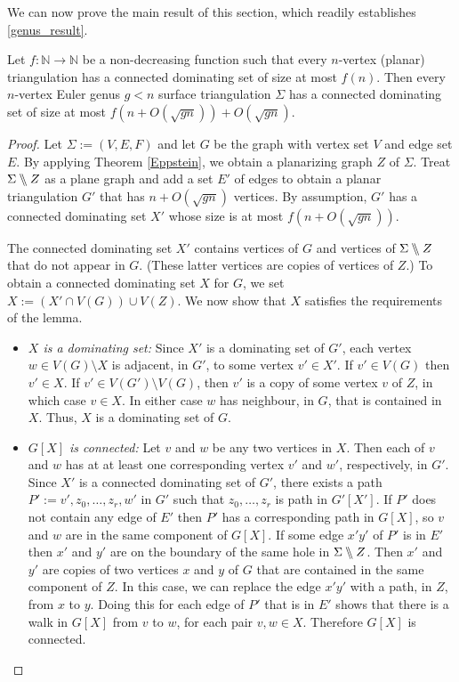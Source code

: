 We can now prove the main result of this section, which readily establishes \cref{genus_result}.

\begin{lem}\label{generic_surface_thm}
    Let $f:\mathbb{N} \longrightarrow \mathbb{N}$ be a non-decreasing function such that every $n$-vertex (planar) triangulation has a connected dominating set of size at most $f(n)$. Then every $n$-vertex Euler genus $g < n$ surface triangulation $\Sigma$ has a connected dominating set of size at most $f(n + O(\sqrt{gn})) + O(\sqrt{gn})$.
\end{lem}

\begin{proof}
Let $\Sigma:=(V,E,F)$ and let $G$ be the graph with vertex set $V$ and edge set $E$.
By applying Theorem \ref{Eppstein}, we obtain a planarizing graph
$Z$ of $\Sigma$. Treat $\Sigma \bbslash Z$ as a plane graph and add a set $E'$ of edges to obtain a planar triangulation $G'$ that has $n+O(\sqrt{gn})$ vertices. By assumption, $G'$ has a connected dominating set $X'$ whose size is at most $f(n + O(\sqrt{gn}))$.

The connected dominating set $X'$ contains vertices of $G$ and vertices of $\Sigma\bbslash Z$ that do not appear in $G$.  (These latter vertices are copies of vertices of $Z$.) To obtain a connected dominating set $X$ for $G$, we set $X:=(X'\cap V(G))\cup V(Z)$.   We now show that $X$ satisfies the requirements of the lemma.
\begin{itemize}
    \item \emph{$X$ is a dominating set:} Since $X'$ is a dominating set of $G'$, each vertex $w\in V(G)\setminus X$ is adjacent, in $G'$, to some vertex $v'\in X'$.  If $v'\in V(G)$ then $v'\in X$.  If $v'\in V(G')\setminus V(G)$, then $v'$ is a copy of some vertex $v$ of $Z$, in which case $v\in X$. In either case $w$ has neighbour, in $G$, that is contained in $X$.  Thus, $X$ is a dominating set of $G$.

    \item \emph{$G[X]$ is connected:} Let $v$ and $w$ be any two vertices in $X$. Then each of $v$ and $w$ has at at least one corresponding vertex $v'$ and $w'$, respectively, in $G'$.   Since $X'$ is a connected dominating set of $G'$, there exists a path $P':=v',z_0,\ldots,z_r,w'$ in $G'$ such that $z_0,\ldots,z_r$ is path in $G'[X']$.  If $P'$ does not contain any edge of $E'$ then $P'$ has a corresponding path in $G[X]$, so $v$ and $w$ are in the same component of $G[X]$.  If some edge $x'y'$ of $P'$ is in $E'$ then $x'$ and $y'$ are on the boundary of the same hole in $\Sigma\bbslash Z$.  Then $x'$ and $y'$ are copies of two vertices $x$ and $y$ of $G$ that are contained in the same component of $Z$.  In this case, we can replace the edge $x'y'$ with a path, in $Z$, from $x$ to $y$.  Doing this for each edge of $P'$ that is in $E'$ shows that there is a walk in $G[X]$ from $v$ to $w$, for each pair $v,w\in X$. Therefore $G[X]$ is connected.


\end{itemize}
\end{proof}
